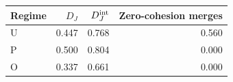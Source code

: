\begin{tabular}{lrrr}\toprule
	Regime & $D_J$ & $D_J^{\rm int}$ & Zero-cohesion merges\\\midrule
	U & 0.447 & 0.768 & 0.560\\
	P & 0.500 & 0.804 & 0.000\\
	O & 0.337 & 0.661 & 0.000\\
	\bottomrule
\end{tabular}
